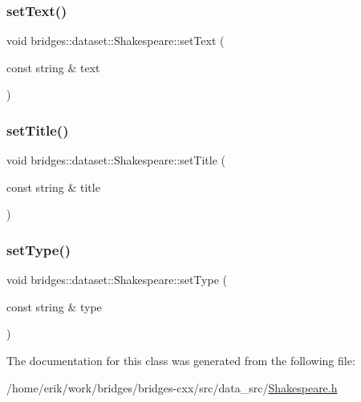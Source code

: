 \subsubsection{\texorpdfstring{set\+Text()}{setText()}}
{\footnotesize\ttfamily void bridges\+::dataset\+::\+Shakespeare\+::set\+Text (\begin{DoxyParamCaption}\item[{const string \&}]{text }\end{DoxyParamCaption})\hspace{0.3cm}{\ttfamily [inline]}}

\mbox{\label{classbridges_1_1dataset_1_1_shakespeare_a92c11a229b38913fea73cfe26474587b}} 
\subsubsection{\texorpdfstring{set\+Title()}{setTitle()}}
{\footnotesize\ttfamily void bridges\+::dataset\+::\+Shakespeare\+::set\+Title (\begin{DoxyParamCaption}\item[{const string \&}]{title }\end{DoxyParamCaption})\hspace{0.3cm}{\ttfamily [inline]}}

\mbox{\label{classbridges_1_1dataset_1_1_shakespeare_a4e9d1126524d2b10f5fe36ffd4588f15}} 
\subsubsection{\texorpdfstring{set\+Type()}{setType()}}
{\footnotesize\ttfamily void bridges\+::dataset\+::\+Shakespeare\+::set\+Type (\begin{DoxyParamCaption}\item[{const string \&}]{type }\end{DoxyParamCaption})\hspace{0.3cm}{\ttfamily [inline]}}



The documentation for this class was generated from the following file\+:\begin{DoxyCompactItemize}
\item 
/home/erik/work/bridges/bridges-\/cxx/src/data\+\_\+src/\hyperlink{_shakespeare_8h}{Shakespeare.\+h}\end{DoxyCompactItemize}
